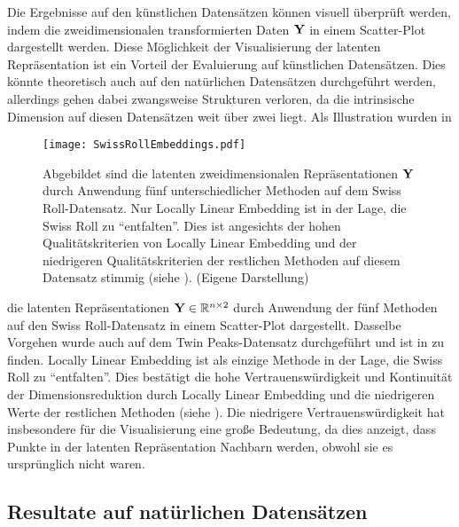 Die Ergebnisse auf den künstlichen Datensätzen können visuell überprüft werden, indem die
zweidimensionalen transformierten Daten $\mat{Y}$ in einem Scatter-Plot dargestellt werden. Diese
Möglichkeit der Visualisierung der latenten Repräsentation ist ein Vorteil der Evaluierung auf
künstlichen Datensätzen. Dies könnte theoretisch auch auf den natürlichen Datensätzen durchgeführt
werden, allerdings gehen dabei zwangsweise Strukturen verloren, da die intrinsische Dimension auf
diesen Datensätzen weit über zwei liegt. Als Illustration wurden in
\begin{figure}[ht]
	\centering
	\texttt{[image: SwissRollEmbeddings.pdf]}
	\caption[Latente zweidimensionale Repräsentationen  $\mat{Y}$ durch Anwendung fünf unterschiedlicher Methoden auf dem Swiss Roll-Datensatzes]{Abgebildet sind die latenten zweidimensionalen Repräsentationen $\mat{Y}$ durch Anwendung fünf unterschiedlicher Methoden auf dem Swiss Roll-Datensatz. Nur Locally Linear Embedding ist in der Lage, die Swiss Roll zu \enquote{entfalten}. Dies ist angesichts der hohen Qualitätskriterien von Locally Linear Embedding und der niedrigeren Qualitätskriterien der restlichen Methoden auf diesem Datensatz stimmig (siehe ). (Eigene Darstellung)}
	\label{fig:SwissRollEmbeddings}
\end{figure}
die latenten Repräsentationen $\mathbf{Y} \in \mathbb{R}^{n \times 2}$ durch Anwendung der fünf Methoden auf den Swiss Roll-Datensatz in einem Scatter-Plot dargestellt. Dasselbe Vorgehen wurde auch auf dem Twin Peaks-Datensatz durchgeführt und ist in
 zu finden. Locally Linear Embedding ist als einzige Methode in der Lage, die Swiss Roll zu \enquote{entfalten}. Dies bestätigt die hohe Vertrauenswürdigkeit und Kontinuität der Dimensionsreduktion durch Locally Linear Embedding und die niedrigeren Werte der restlichen Methoden (siehe ). Die niedrigere Vertrauenswürdigkeit hat insbesondere für die Visualisierung eine große Bedeutung, da dies anzeigt, dass Punkte in der latenten Repräsentation Nachbarn werden, obwohl sie es ursprünglich nicht waren.

\subsection{Resultate auf natürlichen Datensätzen}
\label{ch:Vergleich:sec:Resultate:natuerlich}

